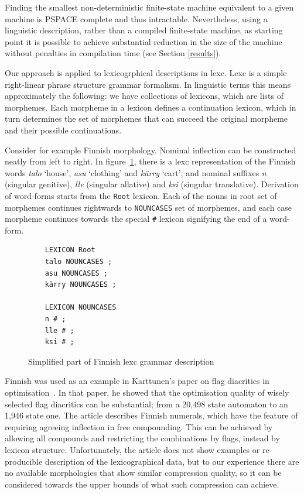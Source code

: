 \documentclass[11pt]{article}
\begin{document}
Finding the smallest non-deterministic finite-state machine equivalent
to a given machine is PSPACE complete \cite{jiang1993} and thus
intractable. Nevertheless, using a linguistic description, rather than
a compiled finite-state machine, as starting point it is possible to
achieve substantial reduction in the size of the machine without
penalties in compilation time (see Section \ref{results}).

Our approach is applied to lexicogrphical descriptions in lexc. Lexc
is a simple right-linear phrase structure grammar formalism. In
linguistic terms this means approximately the following: we have
collections of lexicons, which are lists of morphemes. Each morpheme
in a lexicon defines a continuation lexicon, which in turn determines
the set of morphemes that can succeed the original morpheme and their
possible continuations.

Consider for example Finnish morphology. Nominal inflection can be
constructed neatly from left to right. In figure~\ref{fig:lexc-fin},
there is a lexc representation of the Finnish words \emph{talo} `house',
\emph{asu} `clothing' and \emph{kärry} `cart', and nominal suffixes
\emph{n} (singular genitive), \emph{lle} (singular allative) and
\emph{ksi} (singular translative). Derivation of word-forms starts
from the \texttt{Root} lexicon. Each of the nouns in root set of morphemes
continues rightwards to \texttt{NOUNCASES} set of morphemes, and each
case morpheme continues towards the special \texttt{\#} lexicon
signifying the end of a word-form.

\begin{figure}
    \centering
    \begin{verbatim}
    LEXICON Root
    talo NOUNCASES ;
    asu NOUNCASES ;
    kärry NOUNCASES ;

    LEXICON NOUNCASES
    n # ;
    lle # ;
    ksi # ;
    \end{verbatim}
    \caption{Simplified part of Finnish lexc grammar description
    \label{fig:lexc-fin}}
\end{figure}

Finnish was used as an example in Karttunen's paper on flag diacritics
in optimisation~. In that paper, he
showed that the optimisation quality of wisely selected flag
diacritics can be substantial; from a 20,498 state automaton to an
1,946 state one. The article describes Finnish numerals, which have
the feature of requiring agreeing inflection in free compounding. This
can be achieved by allowing all compounds and restricting the
combinations by flags, instead by lexicon structure. Unfortunately,
the article does not show examples or re-producible description of the
lexicographical data, but to our experience there are no available
morphologies that show similar compression quality, so it can be
considered towards the upper bounds of what such compression can
achieve.
\end{document}
